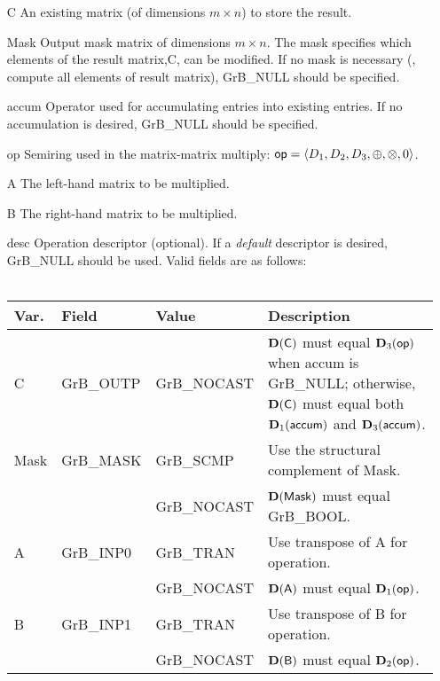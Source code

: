 \begin{itemize}[leftmargin=1.1in]
    \item[{\sf C}]    An existing matrix (of dimensions $m \times n$) to store the result. 

    \item[{\sf Mask}] Output mask matrix of dimensions $m \times n$. 
    The mask specifies which elements of the result matrix,{\sf C}, can be modified. 
    If no mask is necessary (\ie, compute all elements of result
    matrix), {\sf GrB\_NULL} should be specified.

    \item[{\sf accum}]  Operator used for accumulating entries into existing
     entries. If no accumulation is desired,
    {\sf GrB\_NULL} should be specified.

    \item[{\sf op}]   Semiring used in the matrix-matrix multiply: ${\sf op}=\langle D_1,D_2,D_3,\oplus,\otimes,0 \rangle$.
    \item[{\sf A}]    The left-hand matrix to be multiplied.  
    \item[{\sf B}]    The right-hand matrix to be multiplied. 

    \item[{\sf desc}]  Operation descriptor (optional). If a
    \emph{default} descriptor is desired, {\sf GrB\_NULL} should be
    used. Valid fields are as follows: \\ ~\\
    \begin{tabular}{lllp{2.75in}}
    Var. & Field  & Value & Description \\
    \hline
    {\sf C}    & {\sf GrB\_OUTP} & {\sf GrB\_NOCAST} & $\bold{D}({\sf C})$ must equal 
                                     $\bold{D}_3({\sf op})$ when {\sf accum} is {\sf GrB\_NULL}; 
                                     otherwise, $\bold{D}({\sf C})$ must equal both 
                                     $\bold{D}_1({\sf accum})$ and $\bold{D}_3({\sf accum})$.\\
    {\sf Mask} & {\sf GrB\_MASK} & {\sf GrB\_SCMP}   & Use the structural complement of {\sf Mask}. \\
               &                 & {\sf GrB\_NOCAST} & $\bold{D}({\sf Mask})$ must equal {\sf GrB\_BOOL}. \\
    {\sf A}    & {\sf GrB\_INP0} & {\sf GrB\_TRAN}   & Use transpose of {\sf A} for operation. \\
               &                 & {\sf GrB\_NOCAST} & $\bold{D}({\sf A})$ must equal $\bold{D}_1({\sf op})$. \\
    {\sf B}    & {\sf GrB\_INP1} & {\sf GrB\_TRAN}   & Use transpose of {\sf B} for operation. \\
               &                 & {\sf GrB\_NOCAST} & $\bold{D}({\sf B})$ must equal $\bold{D}_2({\sf op})$. \\
    \end{tabular}
\end{itemize}

